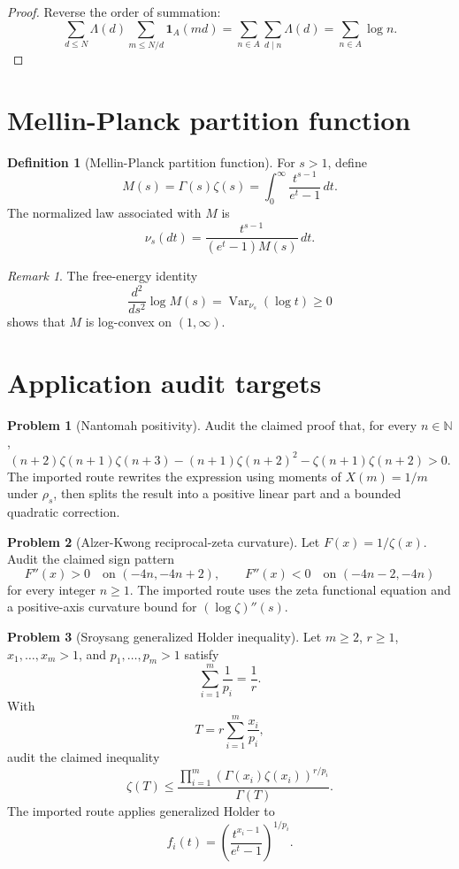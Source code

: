 \documentclass[11pt]{article}
\theoremstyle{definition}
\newtheorem{definition}{Definition}
\newtheorem{problem}{Problem}
\theoremstyle{remark}
\newtheorem{remark}{Remark}
\DeclareMathOperator{\Var}{Var}
\newcommand{\N}{\mathbb N}
\newcommand{\1}{\mathbf 1}
\begin{document}
\begin{proof}
Reverse the order of summation:
\[
\sum_{d\le N}\Lambda(d)\sum_{m\le N/d}\1_A(md)
=\sum_{n\in A}\sum_{d\mid n}\Lambda(d)
=\sum_{n\in A}\log n.
\]
\end{proof}

\section{Mellin-Planck partition function}

\begin{definition}[Mellin-Planck partition function]
For \(s>1\), define
\[
M(s)=\Gamma(s)\zeta(s)
=\int_0^\infty \frac{t^{s-1}}{e^t-1}\,dt.
\]
The normalized law associated with \(M\) is
\[
\nu_s(dt)=\frac{t^{s-1}}{(e^t-1)M(s)}\,dt.
\]
\end{definition}

\begin{remark}
The free-energy identity
\[
\frac{d^2}{ds^2}\log M(s)=\Var_{\nu_s}(\log t)\ge 0
\]
shows that \(M\) is log-convex on \((1,\infty)\).
\end{remark}

\section{Application audit targets}

\begin{problem}[Nantomah positivity]
Audit the claimed proof that, for every \(n\in\N\),
\[
(n+2)\zeta(n+1)\zeta(n+3)
-(n+1)\zeta(n+2)^2
-\zeta(n+1)\zeta(n+2)>0.
\]
The imported route rewrites the expression using moments of \(X(m)=1/m\) under \(\rho_s\), then splits the result into a positive linear part and a bounded quadratic correction.
\end{problem}

\begin{problem}[Alzer-Kwong reciprocal-zeta curvature]
Let \(F(x)=1/\zeta(x)\).  Audit the claimed sign pattern
\[
F''(x)>0\quad\text{on }(-4n,-4n+2),
\qquad
F''(x)<0\quad\text{on }(-4n-2,-4n)
\]
for every integer \(n\ge1\).  The imported route uses the zeta functional equation and a positive-axis curvature bound for \((\log\zeta)''(s)\).
\end{problem}

\begin{problem}[Sroysang generalized Holder inequality]
Let \(m\ge2\), \(r\ge1\), \(x_1,\ldots,x_m>1\), and \(p_1,\ldots,p_m>1\) satisfy
\[
\sum_{i=1}^m\frac1{p_i}=\frac1r.
\]
With
\[
T=r\sum_{i=1}^m\frac{x_i}{p_i},
\]
audit the claimed inequality
\[
\zeta(T)\le
\frac{\prod_{i=1}^m(\Gamma(x_i)\zeta(x_i))^{r/p_i}}{\Gamma(T)}.
\]
The imported route applies generalized Holder to
\[
f_i(t)=\left(\frac{t^{x_i-1}}{e^t-1}\right)^{1/p_i}.
\]
\end{problem}
\end{document}
